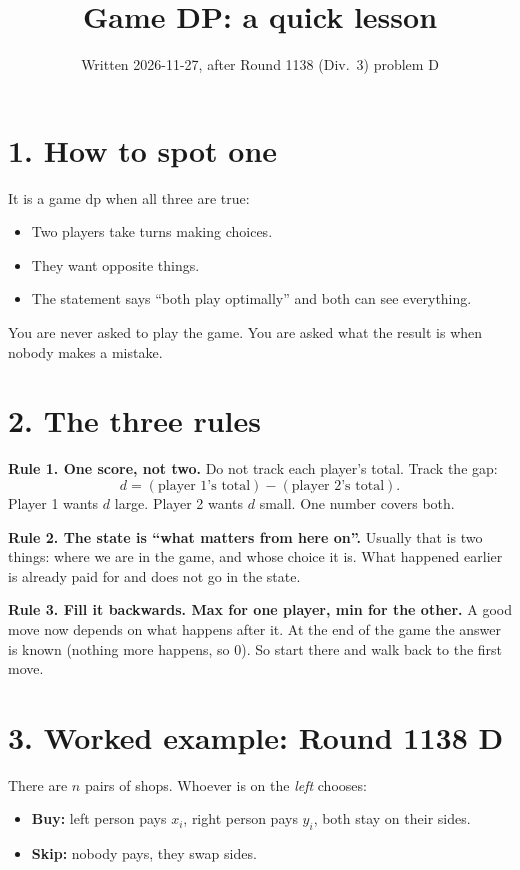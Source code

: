 \documentclass[11pt]{article}
\title{Game DP: a quick lesson}
\author{}
\date{Written 2026-11-27, after Round 1138 (Div.~3) problem D}
\begin{document}
\maketitle

\section*{1. How to spot one}

It is a game dp when all three are true:

\begin{itemize}
  \item Two players take turns making choices.
  \item They want opposite things.
  \item The statement says ``both play optimally'' and both can see everything.
\end{itemize}

You are never asked to play the game. You are asked what the result is when
nobody makes a mistake.

\section*{2. The three rules}

\textbf{Rule 1. One score, not two.}
Do not track each player's total. Track the gap:
\[
  d = (\text{player 1's total}) - (\text{player 2's total}).
\]
Player 1 wants $d$ large. Player 2 wants $d$ small. One number covers both.

\textbf{Rule 2. The state is ``what matters from here on''.}
Usually that is two things: where we are in the game, and whose choice it is.
What happened earlier is already paid for and does not go in the state.

\textbf{Rule 3. Fill it backwards. Max for one player, min for the other.}
A good move now depends on what happens after it. At the end of the game the
answer is known (nothing more happens, so $0$). So start there and walk back
to the first move.

\section*{3. Worked example: Round 1138 D}

There are $n$ pairs of shops. Whoever is on the \emph{left} chooses:

\begin{itemize}
  \item \textbf{Buy:} left person pays $x_i$, right person pays $y_i$, both stay on their sides.
  \item \textbf{Skip:} nobody pays, they swap sides.
\end{itemize}
\end{document}
